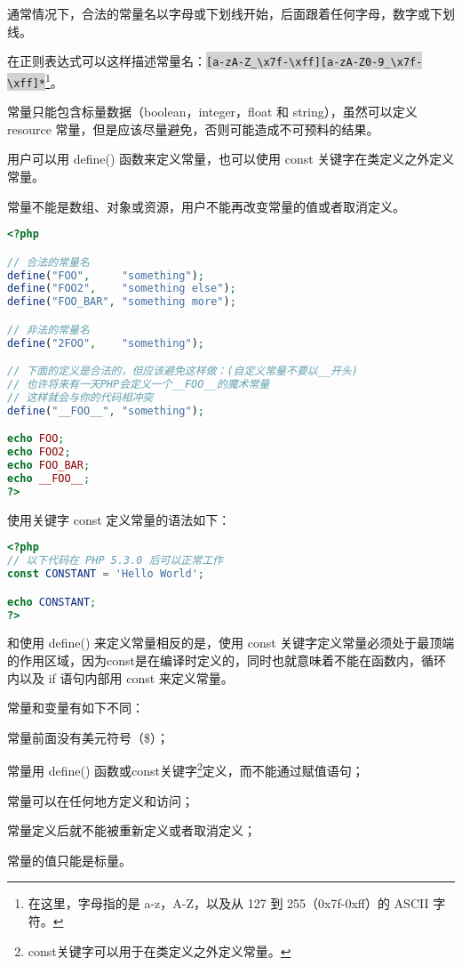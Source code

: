 通常情况下，合法的常量名以字母或下划线开始，后面跟着任何字母，数字或下划线。

在正则表达式可以这样描述常量名：\colorbox{lightgray}{\texttt{[a-zA-Z\_\textbackslash x7f-\textbackslash xff][a-zA-Z0-9\_\textbackslash x7f-\textbackslash xff]*}}\footnote{在这里，字母指的是 a-z，A-Z，以及从 127 到 255（0x7f-0xff）的 ASCII 字符。}。

常量只能包含标量数据（boolean，integer，float 和 string），虽然可以定义 resource 常量，但是应该尽量避免，否则可能造成不可预料的结果。



用户可以用 define() 函数来定义常量，也可以使用 const 关键字在类定义之外定义常量。

常量不能是数组、对象或资源，用户不能再改变常量的值或者取消定义。

\begin{lstlisting}[language=PHP]
<?php

// 合法的常量名
define("FOO",     "something");
define("FOO2",    "something else");
define("FOO_BAR", "something more");

// 非法的常量名
define("2FOO",    "something");

// 下面的定义是合法的，但应该避免这样做：(自定义常量不要以__开头)
// 也许将来有一天PHP会定义一个__FOO__的魔术常量
// 这样就会与你的代码相冲突
define("__FOO__", "something");

echo FOO;
echo FOO2;
echo FOO_BAR;
echo __FOO__;
?>
\end{lstlisting}


使用关键字 const 定义常量的语法如下：

\begin{lstlisting}[language=PHP]
<?php
// 以下代码在 PHP 5.3.0 后可以正常工作
const CONSTANT = 'Hello World';

echo CONSTANT;
?>
\end{lstlisting}



和使用 define() 来定义常量相反的是，使用 const 关键字定义常量必须处于最顶端的作用区域，因为const是在编译时定义的，同时也就意味着不能在函数内，循环内以及 if 语句内部用 const 来定义常量。

常量和变量有如下不同：

\begin{compactitem}
\item 常量前面没有美元符号（\$）；
\item 常量用 define() 函数或const关键字\footnote{const关键字可以用于在类定义之外定义常量。}定义，而不能通过赋值语句；
\item 常量可以在任何地方定义和访问；
\item 常量定义后就不能被重新定义或者取消定义；
\item 常量的值只能是标量。
\end{compactitem}


